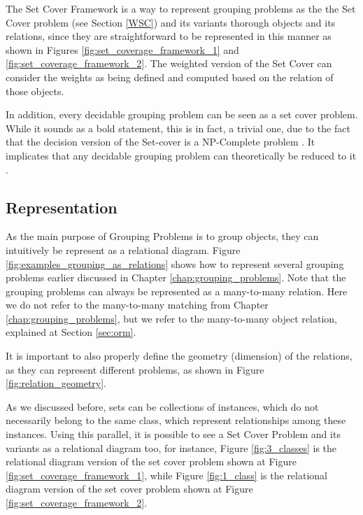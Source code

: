         The Set Cover Framework is a way to represent grouping problems as the the Set Cover problem (see Section \ref{WSC}) and its variants thorough objects and its relations, since they are straightforward to be represented in this manner as shown in Figures \ref{fig:set_coverage_framework_1} and \ref{fig:set_coverage_framework_2}.
        The weighted version of the Set Cover can consider the weights as being defined and computed based on the relation of those objects.

        In addition, every decidable grouping problem can be seen as a set cover problem.
        While it sounds as a bold statement, this is in fact, a trivial one, due to the fact that the decision version of the Set-cover is a NP-Complete problem \cite{Karp1972}.
        It implicates that any decidable grouping problem can theoretically be reduced to it \cite{garey1979computers}.

        
        
    
        \subsection{Representation}
             As the main purpose of Grouping Problems is to group objects, they can intuitively be represent as a relational diagram. Figure \ref{fig:examples_grouping_as_relations} shows how to represent several grouping problems earlier discussed in Chapter \ref{chap:grouping_problems}.
             Note that the grouping problems can always be represented as a many-to-many relation. Here we do not refer to the many-to-many matching from Chapter \ref{chap:grouping_problems}, but we refer to the many-to-many object relation, explained at Section \ref{sec:orm}.

                  
             
            It is important to also properly define the geometry (dimension) of the relations, as they can represent different problems, as shown in Figure \ref{fig:relation_geometry}.

                         

            
            As we discussed before, sets can be collections of instances, which do not necessarily belong to the same class, which represent relationships among these instances. Using this parallel, it is possible to see a Set Cover Problem and its variants as a relational diagram too, for instance, Figure \ref{fig:3_classes} is the relational diagram version of the set cover problem shown at Figure \ref{fig:set_coverage_framework_1}, while Figure \ref{fig:1_class} is the relational diagram version of the set cover problem shown at Figure \ref{fig:set_coverage_framework_2}.


